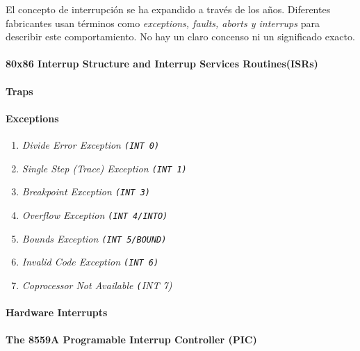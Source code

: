 El concepto de interrupción se ha expandido a través de los años. Diferentes fabricantes usan términos como \textit{exceptions, faults, aborts \textnormal{y} interrups} para describir este comportamiento. No hay un claro concenso ni un significado exacto.

\paragraph{\textnormal{\textbf{80x86 Interrup Structure and Interrup Services Routines(ISRs)}}}

\paragraph{\textnormal{\textbf{Traps}}}

\paragraph{\textnormal{\textbf{Exceptions}}}

\begin{enumerate}
    \item \textit{Divide Error Exception \texttt{(INT 0)}}
    \item \textit{Single Step (Trace) Exception \texttt{(INT 1)}}
    \item \textit{Breakpoint Exception \texttt{(INT 3)}}
    \item \textit{Overflow Exception \texttt{(INT 4/INTO)}}
    \item \textit{Bounds Exception \texttt{(INT 5/BOUND)}}
    \item \textit{Invalid Code Exception \texttt{(INT 6)}}
    \item \textit{Coprocessor Not Available \texttt(INT 7)}
\end{enumerate}

\paragraph{\textnormal{\textbf{Hardware Interrupts}}}

\paragraph{The 8559A Programable Interrup Controller (PIC)}

